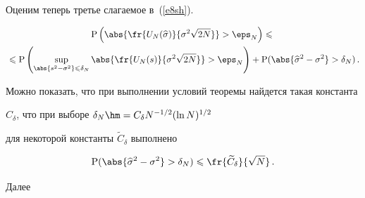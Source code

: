 Оценим теперь третье слагаемое в~(\ref{e8sh}).

\begin{multline}

\mathrm{P}\left(\abs{\fr{U_N(\widehat{\sigma})}{\sigma^2\sqrt{2N}}}>\eps_N\right)\leqslant{}\\

{}\leqslant

\mathrm{P}\left(\sup\limits_{\abs{s^2-\sigma^2}\leqslant\delta_N}\abs{\fr{U_N(s)}{\sigma^2

\sqrt{2N}}}>\eps_N\right)+\mathrm{P}(\abs{\widehat{\sigma}^2-\sigma^2}>\delta_N)\,.\label{e12sh}

\end{multline}



\pagebreak



\noindent

Можно показать, что при выполнении условий теоремы найдется такая константа 

$C_\delta$, что при выборе $\delta_N\hm=C_\delta N^{-1/2}(\ln N)^{1/2}$ 

для некоторой константы $\widetilde{C}_\delta$ выполнено

\begin{equation}

\mathrm{P}(\abs{\widehat{\sigma}^2-\sigma^2}>\delta_N)\leqslant

\fr{\widetilde{C}_\delta}{\sqrt{N}}\,.\label{e13sh}

\end{equation}

Далее 

